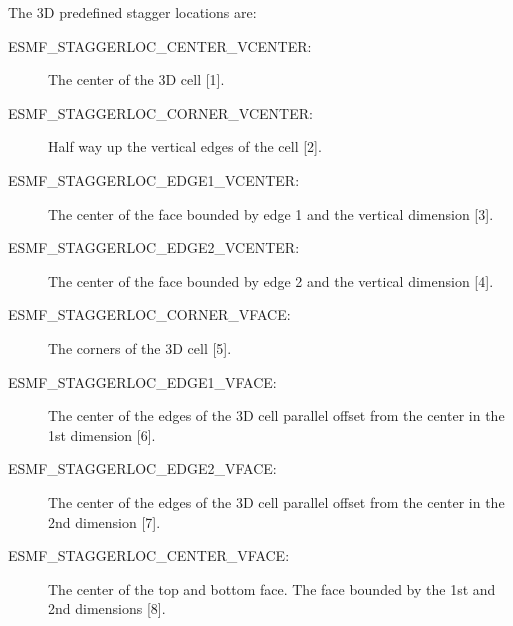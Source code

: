 The 3D predefined stagger locations are:\\
\begin{description}
\item [ESMF\_STAGGERLOC\_CENTER\_VCENTER:] The center of the 3D cell [1].
\item [ESMF\_STAGGERLOC\_CORNER\_VCENTER:] Half way up the vertical edges of the cell [2].
\item [ESMF\_STAGGERLOC\_EDGE1\_VCENTER:] The center of the face bounded by edge 1 and the vertical dimension [3].
\item [ESMF\_STAGGERLOC\_EDGE2\_VCENTER:] The center of the face bounded by edge 2 and the vertical dimension [4]. 
\item [ESMF\_STAGGERLOC\_CORNER\_VFACE:] The corners of the 3D cell [5].
\item [ESMF\_STAGGERLOC\_EDGE1\_VFACE:] The center of the edges of the 3D cell parallel offset from the center in the 1st dimension [6].
\item [ESMF\_STAGGERLOC\_EDGE2\_VFACE:] The center of the edges of the 3D cell parallel offset from the center in the 2nd dimension [7].
\item [ESMF\_STAGGERLOC\_CENTER\_VFACE:] The center of the top and bottom face. The face bounded by the 1st and 2nd dimensions [8]. 
\end{description}


